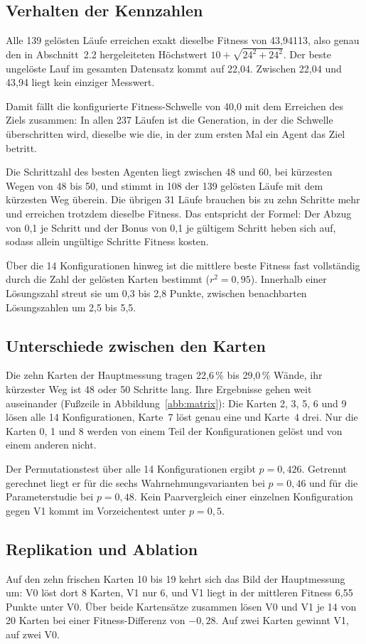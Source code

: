 \documentclass[sigconf]{acmart}
\begin{document}
\subsection{Verhalten der Kennzahlen}
\label{sec:kennzahlen}
Alle 139 gelösten Läufe erreichen exakt dieselbe Fitness von 43,94113, also genau den in Abschnitt~2.2 hergeleiteten Höchstwert $10+\sqrt{24^2+24^2}$. Der beste ungelöste Lauf im gesamten Datensatz kommt auf 22,04. Zwischen 22,04 und 43,94 liegt kein einziger Messwert.

Damit fällt die konfigurierte Fitness-Schwelle von 40,0 mit dem Erreichen des Ziels zusammen: In allen 237 Läufen ist die Generation, in der die Schwelle überschritten wird, dieselbe wie die, in der zum ersten Mal ein Agent das Ziel betritt.

Die Schrittzahl des besten Agenten liegt zwischen 48 und 60, bei kürzesten Wegen von 48 bis 50, und stimmt in 108 der 139 gelösten Läufe mit dem kürzesten Weg überein. Die übrigen 31 Läufe brauchen bis zu zehn Schritte mehr und erreichen trotzdem dieselbe Fitness. Das entspricht der Formel: Der Abzug von 0,1 je Schritt und der Bonus von 0,1 je gültigem Schritt heben sich auf, sodass allein ungültige Schritte Fitness kosten.

Über die 14 Konfigurationen hinweg ist die mittlere beste Fitness fast vollständig durch die Zahl der gelösten Karten bestimmt ($r^2 = 0{,}95$). Innerhalb einer Lösungszahl streut sie um 0,3 bis 2,8 Punkte, zwischen benachbarten Lösungszahlen um 2,5 bis 5,5.

\subsection{Unterschiede zwischen den Karten}
Die zehn Karten der Hauptmessung tragen 22,6\,\% bis 29,0\,\% Wände, ihr kürzester Weg ist 48 oder 50 Schritte lang. Ihre Ergebnisse gehen weit auseinander (Fußzeile in Abbildung~\ref{abb:matrix}): Die Karten 2, 3, 5, 6 und 9 lösen alle 14 Konfigurationen, Karte~7 löst genau eine und Karte~4 drei. Nur die Karten 0, 1 und 8 werden von einem Teil der Konfigurationen gelöst und von einem anderen nicht.

Der Permutationstest über alle 14 Konfigurationen ergibt $p=0{,}426$. Getrennt gerechnet liegt er für die sechs Wahrnehmungsvarianten bei $p=0{,}46$ und für die Parameterstudie bei $p=0{,}48$. Kein Paarvergleich einer einzelnen Konfiguration gegen V1 kommt im Vorzeichentest unter $p=0{,}5$.

\subsection{Replikation und Ablation}
\label{sec:ablation}
Auf den zehn frischen Karten 10 bis 19 kehrt sich das Bild der Hauptmessung um: V0 löst dort 8 Karten, V1 nur 6, und V1 liegt in der mittleren Fitness 6,55 Punkte unter V0. Über beide Kartensätze zusammen lösen V0 und V1 je 14 von 20 Karten bei einer Fitness-Differenz von $-0{,}28$. Auf zwei Karten gewinnt V1, auf zwei V0.
\end{document}
